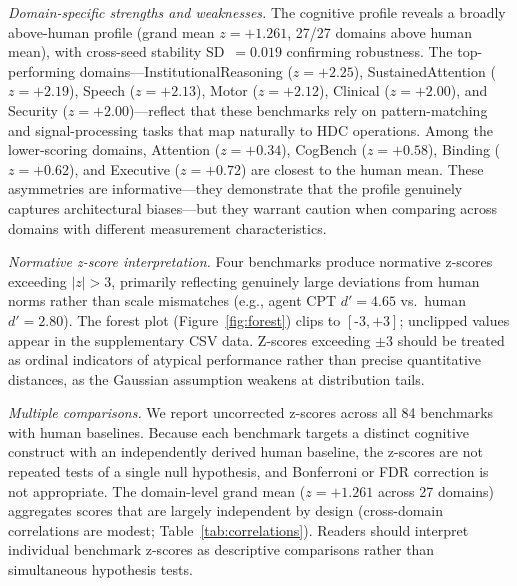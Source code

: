 \documentclass[11pt,letterpaper]{article}
\begin{document}
\emph{Domain-specific strengths and weaknesses.} The cognitive profile reveals a broadly above-human profile (grand mean $z = +1.261$, 27/27 domains above human mean), with cross-seed stability SD~$= 0.019$ confirming robustness. The top-performing domains---InstitutionalReasoning ($z = +2.25$), SustainedAttention ($z = +2.19$), Speech ($z = +2.13$), Motor ($z = +2.12$), Clinical ($z = +2.00$), and Security ($z = +2.00$)---reflect that these benchmarks rely on pattern-matching and signal-processing tasks that map naturally to HDC operations. Among the lower-scoring domains, Attention ($z = +0.34$), CogBench ($z = +0.58$), Binding ($z = +0.62$), and Executive ($z = +0.72$) are closest to the human mean. These asymmetries are informative---they demonstrate that the profile genuinely captures architectural biases---but they warrant caution when comparing across domains with different measurement characteristics.

\emph{Normative z-score interpretation.} Four benchmarks produce normative z-scores exceeding $|z| > 3$, primarily reflecting genuinely large deviations from human norms rather than scale mismatches (e.g., agent CPT $d' {=} 4.65$ vs.\ human $d' {=} 2.80$). The forest plot (Figure~\ref{fig:forest}) clips to $[\text{-}3, \text{+}3]$; unclipped values appear in the supplementary CSV data. Z-scores exceeding $\pm 3$ should be treated as ordinal indicators of atypical performance rather than precise quantitative distances, as the Gaussian assumption weakens at distribution tails.

\emph{Multiple comparisons.} We report uncorrected z-scores across all 84 benchmarks with human baselines. Because each benchmark targets a distinct cognitive construct with an independently derived human baseline, the z-scores are not repeated tests of a single null hypothesis, and Bonferroni or FDR correction is not appropriate. The domain-level grand mean ($z = +1.261$ across 27 domains) aggregates scores that are largely independent by design (cross-domain correlations are modest; Table~\ref{tab:correlations}). Readers should interpret individual benchmark z-scores as descriptive comparisons rather than simultaneous hypothesis tests.
\end{document}

